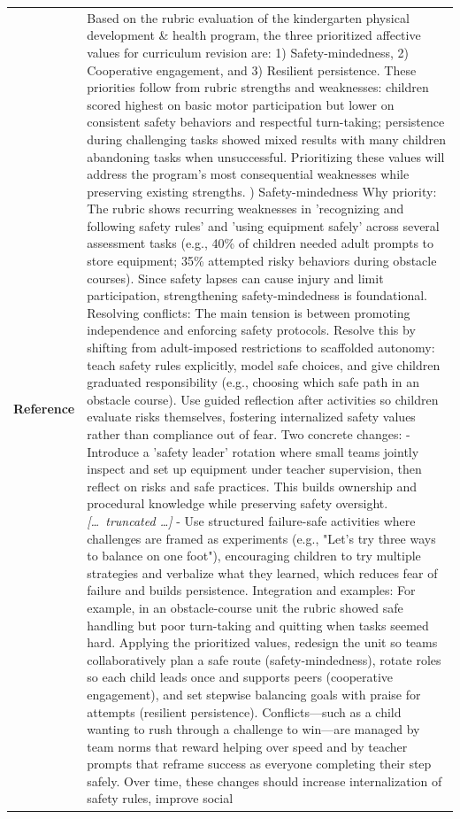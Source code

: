 \begin{longtable}{@{}l p{12.5cm}@{}}
  \textbf{Reference} & Based on the rubric evaluation of the kindergarten physical development \& health program, the three prioritized affective values for curriculum revision are: 1) Safety-mindedness, 2) Cooperative engagement, and 3) Resilient persistence. These priorities follow from rubric strengths and weaknesses: children scored highest on basic motor participation but lower on consistent safety behaviors and respectful turn-taking; persistence during challenging tasks showed mixed results with many children abandoning tasks when unsuccessful. Prioritizing these values will address the program's most consequential weaknesses while preserving existing strengths. \newline 1) Safety-mindedness \newline Why priority: The rubric shows recurring weaknesses in 'recognizing and following safety rules' and 'using equipment safely' across several assessment tasks (e.g., 40\% of children needed adult prompts to store equipment; 35\% attempted risky behaviors during obstacle courses). Since safety lapses can cause injury and limit participation, strengthening safety-mindedness is foundational. \newline Resolving conflicts: The main tension is between promoting independence and enforcing safety protocols. Resolve this by shifting from adult-imposed restrictions to scaffolded autonomy: teach safety rules explicitly, model safe choices, and give children graduated responsibility (e.g., choosing which safe path in an obstacle course). Use guided reflection after activities so children evaluate risks themselves, fostering internalized safety values rather than compliance out of fear. \newline Two concrete changes: \newline - Introduce a 'safety leader' rotation where small teams jointly inspect and set up equipment under teacher supervision, then reflect on risks and safe practices. This builds ownership and procedural knowledge while preserving safety oversight. \newline \textit{[\ldots\ truncated \ldots]} \newline - Use structured failure-safe activities where challenges are framed as experiments (e.g., "Let's try three ways to balance on one foot"), encouraging children to try multiple strategies and verbalize what they learned, which reduces fear of failure and builds persistence. \newline Integration and examples: For example, in an obstacle-course unit the rubric showed safe handling but poor turn-taking and quitting when tasks seemed hard. Applying the prioritized values, redesign the unit so teams collaboratively plan a safe route (safety-mindedness), rotate roles so each child leads once and supports peers (cooperative engagement), and set stepwise balancing goals with praise for attempts (resilient persistence). Conflicts---such as a child wanting to rush through a challenge to win---are managed by team norms that reward helping over speed and by teacher prompts that reframe success as everyone completing their step safely. Over time, these changes should increase internalization of safety rules, improve social 
\end{longtable}
